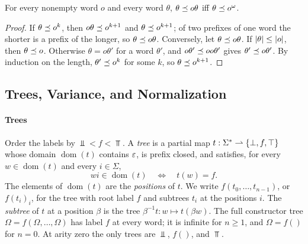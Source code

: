 \begin{lemma}\label{lem:bg-periodic}
For every nonempty word $o$ and every word $\theta$, $\theta\preceq o\theta$ iff
$\theta\preceq o^\omega$.
\end{lemma}
\begin{proof}
If $\theta\preceq o^k$, then $o\theta\preceq o^{k+1}$ and $\theta\preceq o^{k+1}$; of
two prefixes of one word the shorter is a prefix of the longer, so
$\theta\preceq o\theta$. Conversely, let $\theta\preceq o\theta$. If
$\lvert \theta\rvert\le\lvert o\rvert$, then $\theta\preceq o$. Otherwise $\theta=o\theta'$ for a
word $\theta'$, and $o\theta'\preceq oo\theta'$ gives $\theta'\preceq o\theta'$. By
induction on the length, $\theta'\preceq o^k$ for some $k$, so
$\theta\preceq o^{k+1}$.
\end{proof}

\subsection{Trees, Variance, and Normalization}\label{sec:bg-trees}

\paragraph{Trees}
Order the labels by $\Bot<f<\Top$. A \emph{tree} is a partial map
$t:\Sigma^*\rightharpoonup\{\bot,f,\top\}$ whose domain $\operatorname{dom}(t)$ contains
$\varepsilon$, is prefix closed, and satisfies, for every $w\in\operatorname{dom}(t)$
and every $i\in\Sigma$,
\[
 wi\in\operatorname{dom}(t)\quad\Longleftrightarrow\quad t(w)=f .
\]
The elements of $\operatorname{dom}(t)$ are the \emph{positions} of $t$. We
write $f(t_0,\ldots,t_{n-1})$, or $f(t_i)_i$, for the tree with root label $f$
and subtrees $t_i$ at the positions $i$. The \emph{subtree} of $t$ at a
position $\beta$ is the tree $\beta^{-1}t:w\mapsto t(\beta w)$. The full
constructor tree $\Omega=f(\Omega,\ldots,\Omega)$ has label $f$ at every word;
it is infinite for $n\ge1$, and $\Omega=f()$ for $n=0$. At arity zero the only
trees are $\Bot$, $f()$, and $\Top$.

